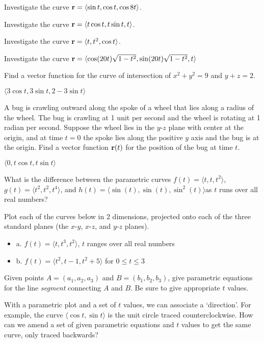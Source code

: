 \begin{exercises}

\exercise Investigate the curve ${\bf r}=\langle \sin t,\cos t,\cos
8t\rangle$.

\exercise Investigate the curve 
${\bf r}=\langle t\cos t,t\sin t,t\rangle$.

\exercise Investigate the curve 
${\bf r}=\langle t,t^2,\cos t\rangle$.

\exercise Investigate the curve 
${\bf r}=\langle \cos(20t)\sqrt{1-t^2},\sin(20t)\sqrt{1-t^2},t\rangle$

\exercise Find a vector function for the curve of intersection of
$x^2+y^2=9$ and $y+z=2$.
\begin{answer} $\langle 3\cos t, 3\sin t, 2-3\sin t\rangle$
\end{answer}

\exercise A bug is crawling outward along the spoke of a wheel that lies along
a radius of the wheel. The bug is crawling at 1 unit per second and
the wheel is rotating at 1 radian per second. Suppose the wheel lies
in the $y$-$z$ plane with center at the origin, and at time $t=0$ the
spoke lies along the positive $y$ axis and the bug is at the origin.
Find a vector function ${\bf r}(t)$
for the position of the bug at time $t$.
\begin{answer} $\langle 0,t\cos t,t\sin t\rangle$
\end{answer}

\exercise What is the difference between the parametric curves
$f(t)=\langle t, t, t^2 \rangle$, $g(t)=\langle t^2, t^2, t^4
\rangle$, and $h(t)=\langle \sin(t), \sin(t), \sin^2(t) \rangle$as $t$
runs over all real numbers?

\exercise Plot each of the curves below in 2 dimensions, projected
onto each of the three standard planes (the $x$-$y$, $x$-$z$, and
$y$-$z$ planes).

\begin{itemize} %
\item{a.} $f(t)=\langle t, t^3, t^2 \rangle$, $t$ ranges over all real numbers
\item{b.} $f(t)=\langle t^2, t-1, t^2+5 \rangle$  for $0\leq t \leq 3$
\end{itemize}

\exercise Given points $A=(a_1, a_2, a_3)$ and $B=(b_1, b_2, b_3)$, give
parametric equations for the line {\em segment} connecting $A$ and
$B$. Be sure to give appropriate $t$ values.

\exercise With a parametric plot and a set of $t$ values, we can associate
a `direction'.  For example, the curve $\langle \cos t, \sin t
\rangle$ is the unit circle traced counterclockwise.  How can we amend
a set of given parametric equations and $t$ values to get the same
curve, only traced backwards?

\end{exercises}

